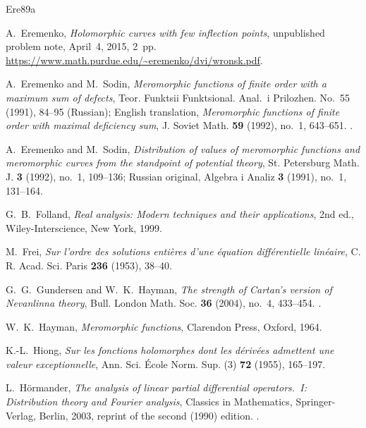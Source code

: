 \documentclass[12pt,letterpaper,reqno]{amsart}
\theoremstyle{definition}
\numberwithin{equation}{section}
\begin{document}
\begin{thebibliography}{Ere89a}


A.~Eremenko,
\emph{Holomorphic curves with few inflection points},
unpublished problem note, April~4, 2015, 2~pp.
\url{https://www.math.purdue.edu/~eremenko/dvi/wronsk.pdf}.

A.~Eremenko and M.~Sodin,
\emph{Meromorphic functions of finite order with a maximum sum of defects},
Teor. Funktsii Funktsional. Anal.\ i Prilozhen. No.~55 (1991), 84--95
(Russian); English translation, \emph{Meromorphic functions of finite
order with maximal deficiency sum}, J. Soviet Math. \textbf{59} (1992),
no.~1, 643--651.
.

A.~Eremenko and M.~Sodin,
\emph{Distribution of values of meromorphic functions and meromorphic
curves from the standpoint of potential theory},
St. Petersburg Math. J. \textbf{3} (1992), no.~1, 109--136;
Russian original, Algebra i Analiz \textbf{3} (1991), no.~1, 131--164.

G.~B.~Folland,
\emph{Real analysis: Modern techniques and their applications},
2nd ed., Wiley-Interscience, New York, 1999.

M.~Frei,
\emph{Sur l'ordre des solutions enti\`eres d'une \'equation diff\'erentielle
lin\'eaire},
C. R. Acad. Sci. Paris \textbf{236} (1953), 38--40.

G.~G.~Gundersen and W.~K.~Hayman,
\emph{The strength of Cartan's version of Nevanlinna theory},
Bull. London Math. Soc. \textbf{36} (2004), no.~4, 433--454.
.

W.~K.~Hayman,
\emph{Meromorphic functions},
Clarendon Press, Oxford, 1964.

K.-L.~Hiong,
\emph{Sur les fonctions holomorphes dont les d\'eriv\'ees admettent
une valeur exceptionnelle},
Ann. Sci. \'Ecole Norm. Sup. (3) \textbf{72} (1955), 165--197.


L.~H\"ormander,
\emph{The analysis of linear partial differential operators.~I:
Distribution theory and Fourier analysis},
Classics in Mathematics, Springer-Verlag, Berlin, 2003,
reprint of the second (1990) edition.
.


\end{thebibliography}
\end{document}
